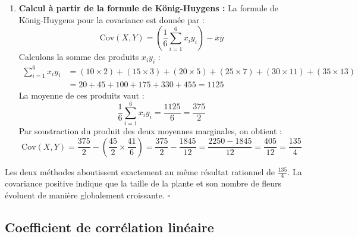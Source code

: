 \documentclass{article}
\begin{document}
{\begin{enumerate}
    \item \textbf{Calcul à partir de la formule de König-Huygens :}
    La formule de König-Huygens pour la covariance est donnée par :
    \[ \text{Cov}(X,Y) = \left( \frac{1}{6} \sum_{i=1}^{6} x_i y_i \right) - \bar{x}\bar{y} \]
    Calculons la somme des produits $x_i y_i$ :
    \begin{align*}
        \sum_{i=1}^{6} x_i y_i &= (10 \times 2) + (15 \times 3) + (20 \times 5) + (25 \times 7) + (30 \times 11) + (35 \times 13) \\
        &= 20 + 45 + 100 + 175 + 330 + 455 = 1125
    \end{align*}
    La moyenne de ces produits vaut :
    \[ \frac{1}{6} \sum_{i=1}^{6} x_i y_i = \frac{1125}{6} = \frac{375}{2} \]
    Par soustraction du produit des deux moyennes marginales, on obtient :
    \[ \text{Cov}(X,Y) = \frac{375}{2} - \left(\frac{45}{2} \times \frac{41}{6}\right) = \frac{375}{2} - \frac{1845}{12} = \frac{2250 - 1845}{12} = \frac{405}{12} = \frac{135}{4} \]
\end{enumerate}

Les deux méthodes aboutissent exactement au même résultat rationnel de $\frac{135}{4}$. La covariance positive indique que la taille de la plante et son nombre de fleurs évoluent de manière globalement croissante. \hfill $\square$
}

\subsection{Coefficient de corrélation linéaire}


\end{document}
